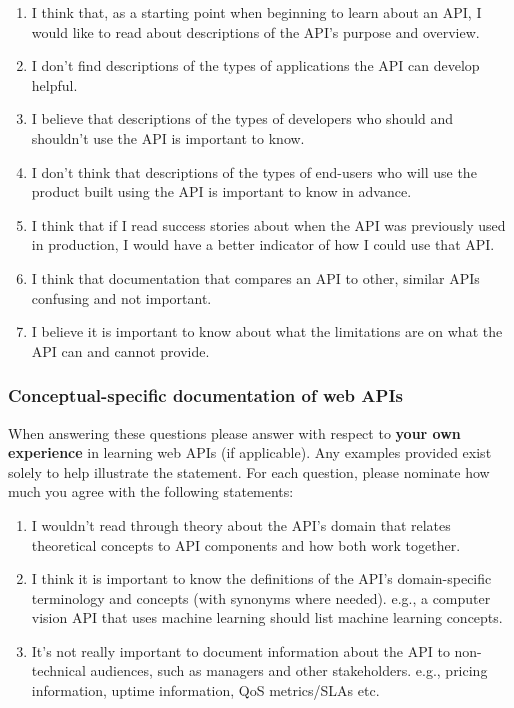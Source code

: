 \begin{enumerate}[label=Q4\alph*.,leftmargin=2\parindent]
\item I think that, as a starting point when beginning to learn about an API, I would like to read about descriptions of the API's purpose and overview. 
\item I don't find descriptions of the types of applications the API can develop helpful. 
\item I believe that descriptions of the types of developers who should and shouldn't use the API is important to know. 
\item I don't think that descriptions of the types of end-users who will use the product built using the API is important to know in advance. 
\item I think that if I read success stories about when the API was previously used in production, I would have a better indicator of how I could use that API. 
\item I think that documentation that compares an API to other, similar APIs confusing and not important. 
\item I believe it is important to know about what the limitations are on what the API can and cannot provide. 
\end{enumerate}

\subsubsection*{Conceptual-specific documentation of web APIs}\noindent
When answering these questions please answer with respect to \textbf{your own experience} in learning web APIs (if applicable). Any examples provided exist solely to help illustrate the statement. For each question, please nominate how much you agree with the following statements: \AgreementScale

\begin{enumerate}[label=Q5\alph*.,leftmargin=2\parindent]
\item I wouldn’t read through theory about the API's domain that relates theoretical concepts to API components and how both work together. 
\item I think it is important to know the definitions of the API’s domain-specific terminology and concepts (with synonyms where needed). 
   e.g., a computer vision API that uses machine learning should list machine learning concepts. 
\item It's not really important to document information about the API to non-technical audiences, such as managers and other stakeholders. 
   e.g., pricing information, uptime information, QoS metrics/SLAs etc.   
\end{enumerate}

